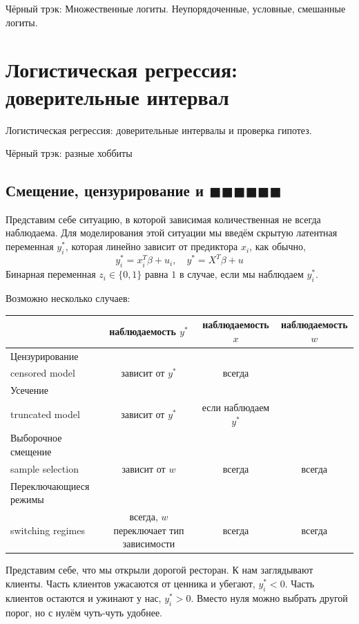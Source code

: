 \documentclass[12pt]{article}
\begin{document}
Чёрный трэк: Множественные логиты. Неупорядоченные, условные, смешанные логиты.

\section{Логистическая регрессия: доверительные интервал}
Логистическая регрессия: доверительные интервалы и проверка гипотез.

Чёрный трэк: разные хоббиты

\subsection{Смещение, цензурирование и $\blacksquare\blacksquare\blacksquare\blacksquare\blacksquare\blacksquare$}

Представим себе ситуацию, в которой зависимая количественная не всегда наблюдаема. 
Для моделирования этой ситуации мы введём скрытую латентная переменная $y_i^*$, которая линейно зависит от предиктора $x_i$, как обычно,
\[
y_i^* = x_i^T \beta + u_i, \quad y^* = X^T \beta + u
\]
Бинарная переменная $z_i \in \{0, 1\}$ равна $1$ в случае, если мы наблюдаем $y_i^*$.

Возможно несколько случаев:

\begin{center}
    \begin{tabular}{lccc}
    	\toprule
            & наблюдаемость $y^*$ & наблюдаемость $x$ & наблюдаемость $w$ \\
        \midrule
         Цензурирование \\ censored model & зависит от  $y^*$ &всегда & \\ 
         Усечение \\ truncated model & зависит от $y^*$ & если наблюдаем $y^*$  \\
         Выборочное смещение \\ sample selection & зависит от $w$  & всегда & всегда \\
         Переключающиеся режимы \\ switching regimes & всегда, $w$ переключает тип зависимости & всегда & всегда \\   
      \bottomrule
    \end{tabular}
\end{center}

Представим себе, что мы открыли дорогой ресторан. 
К нам заглядывают клиенты. 
Часть клиентов ужасаются от ценника и убегают, $y_i^* < 0$.
Часть клиентов остаются и ужинают у нас, $y_i^* > 0$.
Вместо нуля можно выбрать другой порог, но с нулём чуть-чуть удобнее. 
\end{document}
